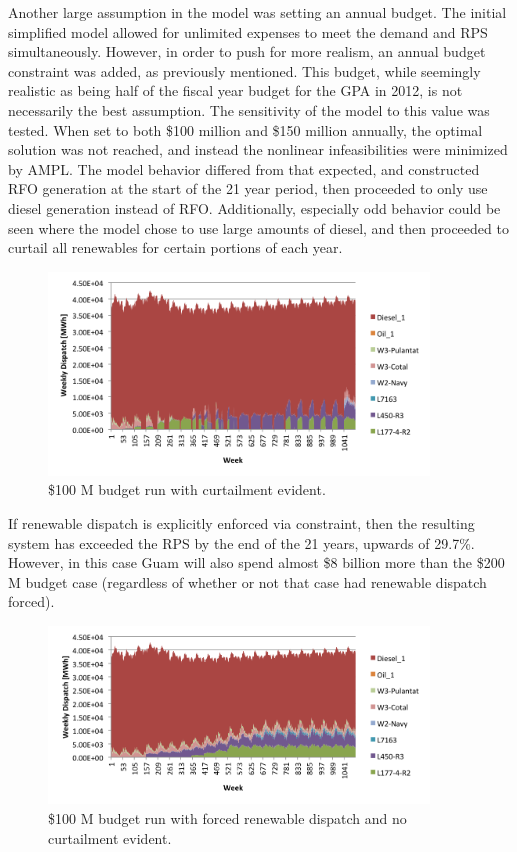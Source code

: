 \documentclass[12pt,letterpaper,fleqn]{article}
\begin{document}
Another large assumption in the model was setting an annual
budget. The initial simplified model allowed for unlimited expenses to
meet the demand and RPS simultaneously. However, in order to push for
more realism, an annual budget constraint was added, as previously
mentioned. This budget, while seemingly realistic as being half of the
fiscal year budget for the GPA in 2012, is not necessarily the best
assumption. The sensitivity of the model to this value was
tested. When set to both \$100 million and \$150 million annually, the
optimal solution was not reached, and instead the nonlinear
infeasibilities were minimized by AMPL. The model behavior differed
from that expected, and constructed RFO generation at the start of the
21 year period, then proceeded to only use diesel generation instead
of RFO. Additionally, especially odd behavior could be seen where the
model chose to use large amounts of diesel, and then proceeded to
curtail all renewables for certain portions of each year.

\begin{figure}[!h]
  \centering
  \includegraphics[width=0.9\textwidth]{img/budget_100_not_forced}
  \caption{\$100 M budget run with curtailment evident.}
  \label{fig:budget_100_not_forced}
\end{figure}

If renewable dispatch is explicitly enforced via constraint, then the
resulting system has exceeded the RPS by the end of the 21 years,
upwards of 29.7\%. However, in this case Guam will also spend almost
\$8 billion more than the \$200 M budget case (regardless of whether
or not that case had renewable dispatch forced).

\begin{figure}[!h]
  \centering
  \includegraphics[width=0.9\textwidth]{img/budget_100_forced}
  \caption{\$100 M budget run with forced renewable dispatch and no
    curtailment evident.}
  \label{fig:budget_100_forced}
\end{figure}
\end{document}
